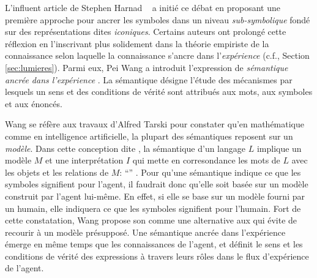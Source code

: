L'influent article de Stephen Harnad \og {} \fg\ \cite{harnad_symbol_1990} a initié ce débat en proposant une première approche pour ancrer les symboles dans un niveau \emph{sub-symbolique} fondé sur des représentations dites \emph{iconiques}. 
Certains auteurs ont prolongé cette réflexion en l'inscrivant plus solidement dans la théorie empiriste de la connaissance selon laquelle la connaissance s'ancre dans l'\emph{expérience} (c.f., Section \ref{sec:lumieres}). 
Parmi eux, Pei Wang a introduit l'expression de \emph{sémantique ancrée dans l'expérience} \cite[]{wang_experience-grounded_2005}.
La sémantique désigne l'étude des mécanismes par lesquels un sens et des conditions de vérité sont attribués aux mots, aux symboles et aux énoncés. 

Wang se réfère aux  travaux d'Alfred Tarski \cite[ ]{tarski_semantic_1944} pour constater qu'en mathématique comme en intelligence artificielle, la plupart des sémantiques reposent sur un \emph{modèle}.
Dans cette conception dite , la sémantique d'un langage $L$ implique un modèle $M$ et une interprétation $I$ qui mette en corresondance les mots de $L$ avec les objets et les relations de $M$: ``'' \cite[p.~284]{wang_experience-grounded_2005}. 
Pour qu'une sémantique  indique ce que les symboles signifient pour l'agent, il faudrait donc qu'elle soit basée sur un modèle construit par l'agent lui-même.
En effet, si elle se base sur un modèle fourni par un humain, elle indiquera ce que les symboles signifient pour l'humain. 
Fort de cette constatation, Wang propose son  comme une alternative aux  qui évite de recourir à un modèle présupposé.  
Une sémantique ancrée dans l'expérience émerge en même temps que les connaissances de l'agent, et définit le sens et les conditions de vérité des expressions à travers leurs rôles dans le flux d'expérience de l'agent. 

